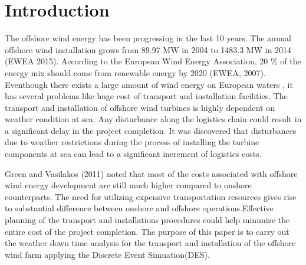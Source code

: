 \section{Introduction}
The offshore wind energy has been progressing in the last 10 years. The annual offshore wind installation grows from 89.97 MW in 2004 to 1483.3 MW in 2014 (EWEA 2015). According to the European Wind Energy Association, 20 \% of the energy mix should come from renewable energy by 2020 (EWEA, 2007). Eventhough there exists a large amount of wind energy on European waters , it has several problems like huge cost of transport and installation facilities. The transport and installation of offshore wind turbines is highly dependent on weather condition at sea. Any disturbance along the logistics chain could result in a significant delay in the project completion. It was discovered \cite{(Lange,Rinne & Haasis,2012)} that disturbances due to weather restrictions during the process of installing the turbine components at sea can lead to a significant increment of logistics costs.

Green and Vasilakos (2011) noted that most of the costs associated with offshore wind energy development are still much higher compared to onshore counterparts. The need for utilizing expensive transportation resources gives rise to substantial difference between onshore and offshore operations.Effective planning of the transport and installations procedures could help minimize the entire cost of the project completion. The purpose of this paper is to carry out the weather down time analysis for the transport and installation of the offshore wind farm applying the Discrete Event Simuation(DES).